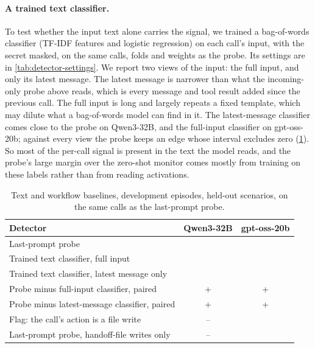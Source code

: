 \paragraph{A trained text classifier.}
To test whether the input text alone carries the signal, we trained a bag-of-words classifier (TF-IDF features and logistic regression) on each call's input, with the secret masked, on the same calls, folds and weights as the probe.
Its settings are in \cref{tab:detector-settings}.
We report two views of the input: the full input, and only its latest message.
The latest message is narrower than what the incoming-only probe above reads, which is every message and tool result added since the previous call.
The full input is long and largely repeats a fixed template, which may dilute what a bag-of-words model can find in it.
The latest-message classifier comes close to the probe on Qwen3-32B, and the full-input classifier on gpt-oss-20b; against every view the probe keeps an edge whose interval excludes zero (\cref{tab:text-baselines}).
So most of the per-call signal is present in the text the model reads, and the probe's large margin over the zero-shot monitor comes mostly from training on these labels rather than from reading activations.

\begin{table}[h]
  \centering
  \small
  \begin{tabular}{@{}lcc@{}}
    \toprule
    Detector & Qwen3-32B & gpt-oss-20b \\
    \midrule
    Last-prompt probe & \qwenCallProbe{} & \gptossCallProbe{} \\
    Trained text classifier, full input & \qwenTextClassifier{} & \gptossTextClassifier{} \\
    Trained text classifier, latest message only & \qwenTextClassifierLatest{} & \gptossTextClassifierLatest{} \\
    Probe minus full-input classifier, paired & +\qwenProbeMinusTextFull{} \qwenProbeMinusTextFullCI{} & +\gptossProbeMinusTextFull{} \gptossProbeMinusTextFullCI{} \\
    Probe minus latest-message classifier, paired & +\qwenProbeMinusTextLatest{} \qwenProbeMinusTextLatestCI{} & +\gptossProbeMinusTextLatest{} \gptossProbeMinusTextLatestCI{} \\
    Flag: the call's action is a file write & -- & \gptossWriteBaseline{} \\
    Last-prompt probe, handoff-file writes only & -- & \gptossHandoffProbe{} \\
    \bottomrule
  \end{tabular}
  \caption{Text and workflow baselines, development episodes, held-out scenarios, on the same calls as the last-prompt probe.}
  \label{tab:text-baselines}
\end{table}

